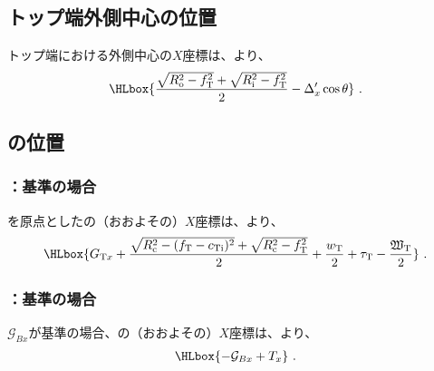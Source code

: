 \subsection{トップ端外側中心の位置}
トップ端における外側中心の$X$座標は、より、
\begin{align*}
  \HLbox{\frac{\sqrt{R_\mathrm o^2-f_\mathrm T^2}+\sqrt{R_\mathrm i^2-f_\mathrm T^2}}2-\Delta_x'\cos\theta}\ .
\end{align*}


\clearpage
\subsection{\TopOutcutCenter の位置}

\subsubsection{\TopOutcutCenter：\TopOutcutAsideThickness 基準の場合}
\TableCenter を原点とした\TopOutcutCenter の（おおよその）$X$座標は、より、
\begin{align*}
  \HLbox{%
    G_{\mathrm Tx}
    +\frac{\sqrt{R_\mathrm c^2-(f_\mathrm T-c_\mathrm{Ti})^2}+\sqrt{R_\mathrm c^2-f_\mathrm T^2}}2
    +\frac{w_\mathrm T}2+\tau_\mathrm T-\frac{\mathfrak W_\mathrm T}2
  }\ .
\end{align*}

\subsubsection{\TopOutcutCenter：\BottomOutcutAsideThickness 基準の場合}
\BottomOutcutCenter$\mathcal G_{Bx}$が基準の場合、\TopOutcutCenter の（おおよその）$X$座標は、より、
\begin{align*}
  \HLbox{-\mathcal G_{Bx}+T_x}\ .
\end{align*}


